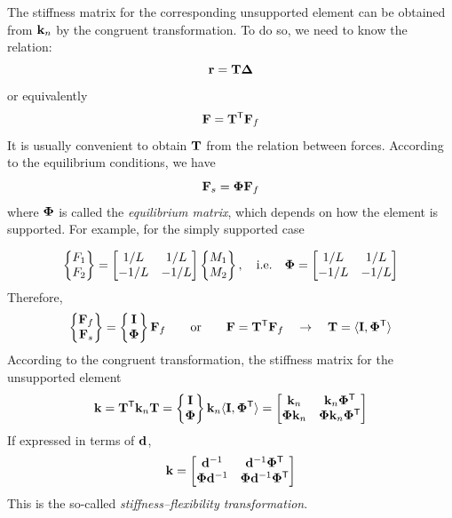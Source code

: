 The stiffness matrix for the corresponding unsupported element can be obtained from $\mathbf{k}_n$ by the congruent transformation. To do so, we need to know the relation:
\begin{equation*}
  \mathbf{r} = \mathbf{T}\bm{\Delta}
\end{equation*}
or equivalently
\begin{equation*}
  \mathbf{F} = \mathbf{T}^{\mathsf{T}}\mathbf{F}_f
\end{equation*}
It is usually convenient to obtain $\mathbf{T}$ from the relation between forces. According to the equilibrium conditions, we have
\begin{equation}
  \mathbf{F}_s = \bm{\Phi}\mathbf{F}_f
\end{equation}
where $\bm{\Phi}$ is called the \emph{equilibrium matrix}, which depends on how the element is supported. For example, for the simply supported case
\begin{fig}
  
\end{fig}
\begin{equation*}
  \begin{Bmatrix}F_1\\ F_2\end{Bmatrix} = \begin{bmatrix}1/L & 1/L\\ -1/L & -1/L\end{bmatrix}\begin{Bmatrix}M_1\\ M_2\end{Bmatrix},\quad\text{i.e.}\quad \bm{\Phi} = \begin{bmatrix}1/L & 1/L\\ -1/L & -1/L\end{bmatrix}
\end{equation*}
Therefore,
\begin{equation*}
  \begin{Bmatrix}\mathbf{F}_f\\ \mathbf{F}_s\end{Bmatrix} = \begin{Bmatrix}\mathbf{I}\\ \bm{\Phi}\end{Bmatrix}\mathbf{F}_f\qquad\text{or}\qquad \mathbf{F} = \mathbf{T}^{\mathsf{T}}\mathbf{F}_f\quad\rightarrow\quad \mathbf{T} = \langle\mathbf{I}, \bm{\Phi}^{\mathsf{T}}\rangle
\end{equation*}
According to the congruent transformation, the stiffness matrix for the unsupported element
\begin{equation}
  \mathbf{k} = \mathbf{T}^{\mathsf{T}}\mathbf{k}_n\mathbf{T} = \begin{Bmatrix}\mathbf{I}\\ \bm{\Phi}\end{Bmatrix}\mathbf{k}_n\langle\mathbf{I}, \bm{\Phi}^{\mathsf{T}}\rangle = \begin{bmatrix}\mathbf{k}_n & \mathbf{k}_n\bm{\Phi}^{\mathsf{T}}\\ \bm{\Phi}\mathbf{k}_n & \bm{\Phi}\mathbf{k}_n\bm{\Phi}^{\mathsf{T}}\end{bmatrix}
\end{equation}
If expressed in terms of $\mathbf{d}$,
\begin{equation}
  \mathbf{k} = \begin{bmatrix}\mathbf{d}^{-1} & \mathbf{d}^{-1}\bm{\Phi}^{\mathsf{T}}\\ \bm{\Phi}\mathbf{d}^{-1} & \bm{\Phi}\mathbf{d}^{-1}\bm{\Phi}^{\mathsf{T}}\end{bmatrix}
\end{equation}
This is the so-called \emph{stiffness--flexibility transformation}.

